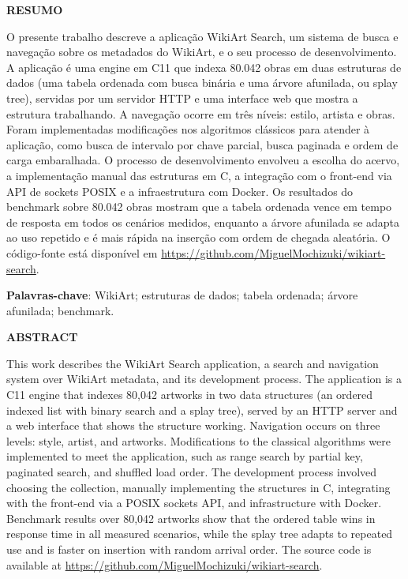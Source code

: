 \documentclass[12pt,a4paper,oneside]{article}
\begin{document}
\clearpage
\thispagestyle{empty}
\begin{center}
  {\normalfont\bfseries\MakeUppercase{Resumo}}
  \bigskip
\end{center}

\noindent O presente trabalho descreve a aplicação WikiArt Search, um sistema de busca e navegação sobre os metadados do WikiArt, e o seu processo de desenvolvimento. A aplicação é uma engine em C11 que indexa 80.042 obras em duas estruturas de dados (uma tabela ordenada com busca binária e uma árvore afunilada, ou splay tree), servidas por um servidor HTTP e uma interface web que mostra a estrutura trabalhando. A navegação ocorre em três níveis: estilo, artista e obras. Foram implementadas modificações nos algoritmos clássicos para atender à aplicação, como busca de intervalo por chave parcial, busca paginada e ordem de carga embaralhada. O processo de desenvolvimento envolveu a escolha do acervo, a implementação manual das estruturas em C, a integração com o front-end via API de sockets POSIX e a infraestrutura com Docker. Os resultados do benchmark sobre 80.042 obras mostram que a tabela ordenada vence em tempo de resposta em todos os cenários medidos, enquanto a árvore afunilada se adapta ao uso repetido e é mais rápida na inserção com ordem de chegada aleatória. O código-fonte está disponível em \url{https://github.com/MiguelMochizuki/wikiart-search}.

\bigskip

\noindent \textbf{Palavras-chave}: WikiArt; estruturas de dados; tabela ordenada; árvore afunilada; benchmark.

\clearpage
\thispagestyle{empty}
\begin{center}
  {\normalfont\bfseries\MakeUppercase{Abstract}}
  \bigskip
\end{center}

\noindent This work describes the WikiArt Search application, a search and navigation system over WikiArt metadata, and its development process. The application is a C11 engine that indexes 80,042 artworks in two data structures (an ordered indexed list with binary search and a splay tree), served by an HTTP server and a web interface that shows the structure working. Navigation occurs on three levels: style, artist, and artworks. Modifications to the classical algorithms were implemented to meet the application, such as range search by partial key, paginated search, and shuffled load order. The development process involved choosing the collection, manually implementing the structures in C, integrating with the front-end via a POSIX sockets API, and infrastructure with Docker. Benchmark results over 80,042 artworks show that the ordered table wins in response time in all measured scenarios, while the splay tree adapts to repeated use and is faster on insertion with random arrival order. The source code is available at \url{https://github.com/MiguelMochizuki/wikiart-search}.
\end{document}
